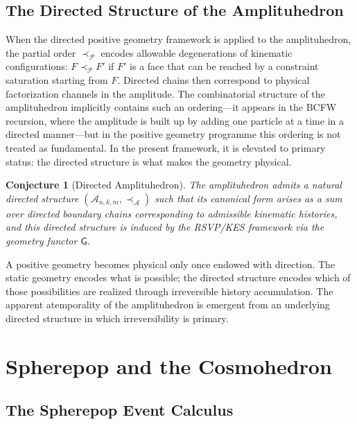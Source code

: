 \documentclass[12pt, oneside]{amsart}
\theoremstyle{plain}
\newtheorem{conjecture}[theorem]{Conjecture}
\theoremstyle{definition}
\theoremstyle{remark}
\newcommand{\Gfun}{\mathsf{G}}
\begin{document}
\subsection{The Directed Structure of the Amplituhedron}

When the directed positive geometry framework is applied to the amplituhedron, the partial order $\prec_{\mathcal{P}}$ encodes allowable degenerations of kinematic configurations: $F \prec_{\mathcal{P}} F'$ if $F'$ is a face that can be reached by a constraint saturation starting from $F$. Directed chains then correspond to physical factorization channels in the amplitude. The combinatorial structure of the amplituhedron implicitly contains such an ordering---it appears in the BCFW recursion, where the amplitude is built up by adding one particle at a time in a directed manner---but in the positive geometry programme this ordering is not treated as fundamental. In the present framework, it is elevated to primary status: the directed structure is what makes the geometry physical.

\begin{conjecture}[Directed Amplituhedron]
\label{conj:directed-amplituhedron}
The amplituhedron admits a natural directed structure $(\mathcal{A}_{n,k,m}, \prec_{\mathcal{A}})$ such that its canonical form arises as a sum over directed boundary chains corresponding to admissible kinematic histories, and this directed structure is induced by the RSVP/KES framework via the geometry functor $\Gfun$.
\end{conjecture}

A positive geometry becomes physical only once endowed with direction. The static geometry encodes what is possible; the directed structure encodes which of those possibilities are realized through irreversible history accumulation. The apparent atemporality of the amplituhedron is emergent from an underlying directed structure in which irreversibility is primary.

\section{Spherepop and the Cosmohedron}
\label{sec:spherepop}

\subsection{The Spherepop Event Calculus}
\end{document}
